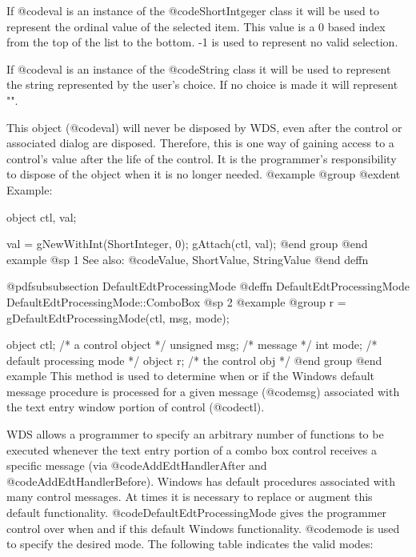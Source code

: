If @code{val} is an instance of the @code{ShortIntgeger} class it will
be used to represent the ordinal value of the selected item.  This value
is a 0 based index from the top of the list to the bottom.  -1 is used
to represent no valid selection.

If @code{val} is an instance of the @code{String} class it will be used
to represent the string represented by the user's choice.  If no choice is
made it will represent "".

This object (@code{val}) will never be disposed by WDS, even after
the control or associated dialog are disposed.  Therefore, this
is one way of gaining access to a control's value after the life
of the control.  It is the programmer's responsibility to dispose of
the object when it is no longer needed.
@example
@group
@exdent Example:

object  ctl, val;

val = gNewWithInt(ShortInteger, 0);
gAttach(ctl, val);
@end group
@end example
@sp 1
See also:  @code{Value, ShortValue, StringValue}
@end deffn












@pdfsubsubsection {DefaultEdtProcessingMode}
@deffn {DefaultEdtProcessingMode} DefaultEdtProcessingMode::ComboBox
@sp 2
@example
@group
r = gDefaultEdtProcessingMode(ctl, msg, mode);

object   ctl;   /*  a control object         */
unsigned msg;   /*  message                  */
int      mode;  /*  default processing mode  */
object   r;     /*  the control obj          */
@end group
@end example
This method is used to determine when or if the Windows default message
procedure is processed for a given message (@code{msg}) associated with
the text entry window portion of control (@code{ctl}).

WDS allows a programmer to specify an arbitrary number of functions to
be executed whenever the text entry portion of a combo box control
receives a specific message (via @code{AddEdtHandlerAfter} and
@code{AddEdtHandlerBefore}).  Windows has default procedures associated
with many control messages.  At times it is necessary to replace or
augment this default functionality.  @code{DefaultEdtProcessingMode}
gives the programmer control over when and if this default Windows
functionality.  @code{mode} is used to specify the desired mode.  The
following table indicates the valid modes:

